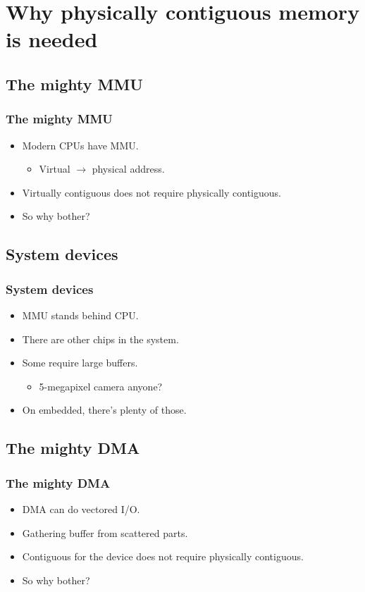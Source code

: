 \section[Introduction]{Why physically contiguous memory is needed}

\subsection{The mighty MMU}
\begin{frame}
  \frametitle{The mighty MMU}

  \begin{itemize}
  \item Modern CPUs have MMU.
    \begin{itemize}
    \item Virtual $\rightarrow$ physical address.
    \end{itemize}
  \item Virtually contiguous does not require physically contiguous.
  \item So why bother?
  \end{itemize}
\end{frame}

\subsection{System devices}
\begin{frame}
  \frametitle{System devices}

  \begin{itemize}
  \item MMU stands behind CPU.
  \item There are other chips in the system.
  \item Some require large buffers.
    \begin{itemize}
    \item 5-megapixel camera anyone?
    \end{itemize}
  \item On embedded, there's plenty of those.
  \end{itemize}
\end{frame}

\subsection{The mighty DMA}
\begin{frame}
  \frametitle{The mighty DMA}

  \begin{itemize}
  \item DMA can do vectored I/O.
  \item Gathering buffer from scattered parts.
  \item Contiguous for the device does not require physically contiguous.
  \item So why bother?
  \end{itemize}
\end{frame}


